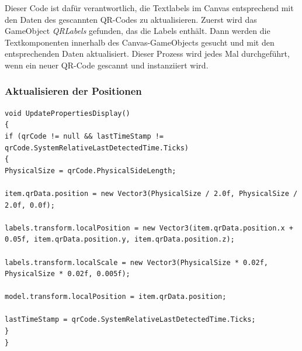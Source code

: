 Dieser Code ist dafür verantwortlich, die Textlabels im Canvas entsprechend mit den Daten des gescannten QR-Codes zu aktualisieren. Zuerst wird das GameObject \textit{QRLabels} gefunden, das die Labels enthält. Dann werden die Textkomponenten innerhalb des Canvas-GameObjects gesucht und mit den entsprechenden Daten aktualisiert. Dieser Prozess wird jedes Mal durchgeführt, wenn ein neuer QR-Code gescannt und instanziiert wird.

\subsubsection*{Aktualisieren der Positionen}
\begin{lstlisting}[style=csharp, caption={Aktualisieren der Position}, label=code:Aktualisieren der Position]
void UpdatePropertiesDisplay()
{
if (qrCode != null && lastTimeStamp != qrCode.SystemRelativeLastDetectedTime.Ticks)
{
PhysicalSize = qrCode.PhysicalSideLength;

item.qrData.position = new Vector3(PhysicalSize / 2.0f, PhysicalSize / 2.0f, 0.0f);

labels.transform.localPosition = new Vector3(item.qrData.position.x + 0.05f, item.qrData.position.y, item.qrData.position.z);

labels.transform.localScale = new Vector3(PhysicalSize * 0.02f, PhysicalSize * 0.02f, 0.005f);

model.transform.localPosition = item.qrData.position;

lastTimeStamp = qrCode.SystemRelativeLastDetectedTime.Ticks;
}
}
\end{lstlisting}

